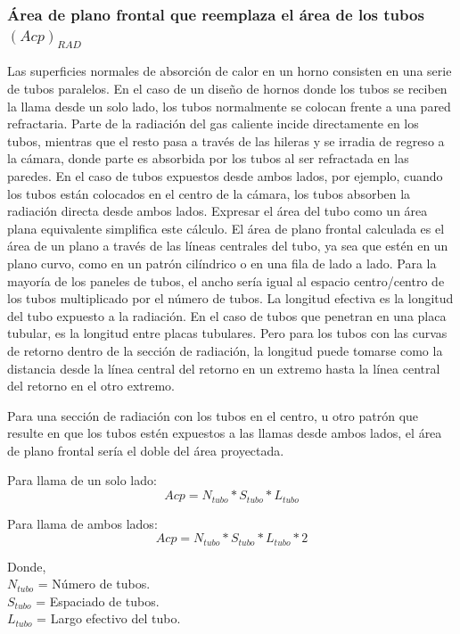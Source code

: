 \subsubsection{Área de plano frontal que reemplaza el área de los tubos $(Acp)_{RAD}$}
\par Las superficies normales de absorción de calor en un horno consisten en una serie de tubos paralelos. En el caso de un diseño de hornos donde los tubos se reciben la llama desde un solo lado, los tubos normalmente se colocan frente a una pared refractaria. Parte de la radiación del gas caliente incide directamente en los tubos, mientras que el resto pasa a través de las hileras y se irradia de regreso a la cámara, donde parte es absorbida por los tubos al ser refractada en las paredes. En el caso de tubos expuestos desde ambos lados, por ejemplo, cuando los tubos están colocados en el centro de la cámara, los tubos absorben la radiación directa desde ambos lados. Expresar el área del tubo como un área plana equivalente simplifica este cálculo. El área de plano frontal calculada es el área de un plano a través de las líneas centrales del tubo, ya sea que estén en un plano curvo, como en un patrón cilíndrico o en una fila de lado a lado. Para la mayoría de los paneles de tubos, el ancho sería igual al espacio centro/centro de los tubos multiplicado por el número de tubos. La longitud efectiva es la longitud del tubo expuesto a la radiación. En el caso de tubos que penetran en una placa tubular, es la longitud entre placas tubulares. Pero para los tubos con las curvas de retorno dentro de la sección de radiación, la longitud puede tomarse como la distancia desde la línea central del retorno en un extremo hasta la línea central del retorno en el otro extremo.
\par Para una sección de radiación con los tubos en el centro, u otro patrón que resulte en que los tubos estén expuestos a las llamas desde ambos lados, el área de plano frontal sería el doble del área proyectada.
\par Para llama de un solo lado:
\begin{equation}
Acp = N_{tubo} * S_{tubo} * L_{tubo}
\end{equation}
\par Para llama de ambos lados:
\begin{equation}
Acp = N_{tubo} * S_{tubo} * L_{tubo} * 2
\end{equation}
\par Donde, \\
$N_{tubo}$ = Número de tubos. \\
$S_{tubo}$ = Espaciado de tubos. \\
$L_{tubo}$ = Largo efectivo del tubo.

